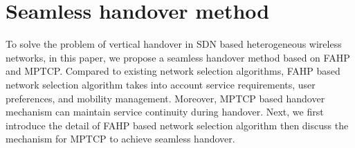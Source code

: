 \documentclass[conference]{IEEEtran}
\begin{document}
\section{Seamless handover method }
To solve the problem of vertical handover in SDN based heterogeneous wireless networks, in this paper, we propose a seamless handover method based on FAHP and MPTCP. Compared to existing network selection algorithms, FAHP based network selection algorithm takes into account service requirements, user preferences, and mobility management. Moreover, MPTCP based handover mechanism can maintain service continuity during handover. Next, we first introduce the detail of FAHP based network selection algorithm then discuss the mechanism for MPTCP to achieve seamless handover.


\begin{comment}
\begin{figure}[htbp!]
	\centering
	\texttt{[image: figures/HWN.png]}
	\caption{Herterogeneous wireless networks environment.}\label{fig:HWN1}
	\vspace{-1em}
\end{figure}
\end{comment}


\begin{comment}
${P_l}\left( \gamma  \right)$ 
\begin{equation}
\label{}
{P_2}\left( \gamma  \right):\mathop {minimize}\limits_{{\bf{v}} \in \nu } {\sum\limits_{l = 1}^L {{\omega _l}\left\| {\widetilde {{{\bf{v}}_l}}} \right\|} _2}
\end{equation}
\end{comment}



\end{document}
